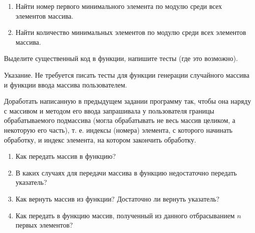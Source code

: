 \begin{enumerate}

	\item Найти номер первого минимального элемента по модулю среди всех элементов массива.

	\item Найти количество минимальных элементов по модулю среди всех элементов массива.

\end{enumerate}


\labtask

Выделите существенный код в функции, напишите тесты (где это возможно).

Указание. Не требуется писать тесты для функции генерации случайного массива и функции ввода массива пользователем. 

\labtask

Доработать написанную в предыдущем задании программу так, чтобы она наряду с массивом и методом его ввода запрашивала у пользователя границы обрабатываемого подмассива (могла обрабатывать не весь массив целиком, а некоторую его часть), т. е. индексы (номера) элемента, с которого начинать обработку, и индекс элемента, на котором закончить обработку.

\labworkquestions

\begin{enumerate}

	\item
		Как передать массив в функцию?
	\item
		В каких случаях для передачи массива в функцию недостаточно передать указатель?
	\item
		Как вернуть массив из функции? Достаточно ли вернуть указатель?
	\item
		Как передать в функцию массив, полученный из данного отбрасыванием $n$ первых элементов?
\end{enumerate}



